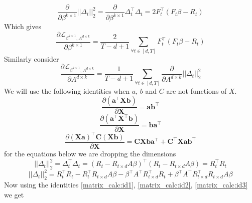 \begin{equation}
    \frac{\partial}{\partial \beta^{k \times 1}} ||\Delta_t||_2^2 =  \frac{\partial}{\partial \beta^{k \times 1}} \Delta_t^\top \Delta_t = 2F_t^\top (F_t \beta - R_t)
\end{equation}
\newline Which gives
\begin{equation}\label{Loss_diff_wrt_beta}
    \frac{\partial \mathcal{L}_{\beta^{k \times 1}, A^{d\times k}}}{\partial \beta^{k \times 1}} = \frac{2}{T-d+1} \sum_{\forall t\in [d,T]} F_t^\top (F_t \beta - R_t)
\end{equation}
\newline Similarly consider 
\begin{equation}
    \frac{\partial \mathcal{L}_{\beta^{k \times 1}, A^{d\times k}}}{\partial A^{d \times k}} = \frac{1}{T-d+1} \sum_{\forall t\in [d,T]} \frac{\partial}{\partial A^{d \times k}} ||\Delta_t||_2^2 
\end{equation}
We will use the following identities when $a$, $b$ and $C$ are not functions of $X$.
\begin{equation} \label{matrix_calc:id1}
\frac{\partial (\mathbf{a}^\top \mathbf{X} \mathbf{b})}{\partial \mathbf{X}} = \mathbf{a} \mathbf{b}^\top
\end{equation}
\begin{equation}\label{matrix_calc:id2}
\frac{\partial (\mathbf{a}^\top \mathbf{X}^\top \mathbf{b})}{\partial \mathbf{X}} = \mathbf{b} \mathbf{a}^\top
\end{equation}
\begin{equation}\label{matrix_calc:id3}
\frac{\partial (\mathbf{X} \mathbf{a})^\top \mathbf{C} (\mathbf{X} \mathbf{b})}{\partial \mathbf{X}} = \mathbf{C} \mathbf{X} \mathbf{b} \mathbf{a}^\top + \mathbf{C}^\top \mathbf{X} \mathbf{a} \mathbf{b}^\top
\end{equation}
\newline for the equations below we are dropping the dimensions
\begin{equation}
    ||\Delta_t||_2^2 = \Delta_t^\top \Delta_t = (R_t-R_{t\times d} A  \beta)^\top (R_t-R_{t\times d} A \beta) = R_t^\top R_t
\end{equation}
\begin{equation}
    ||\Delta_t||_2^2 = R_t^\top R_t - R_t^\top R_{t\times d} A \beta - \beta^\top A^\top  R_{t\times d}^\top R_t+ \beta^\top A^\top  R_{t\times d}^\top R_{t\times d} A \beta
\end{equation}
\newline Now using the identities \ref{matrix_calc:id1}, \ref{matrix_calc:id2}, \ref{matrix_calc:id3} we get 
